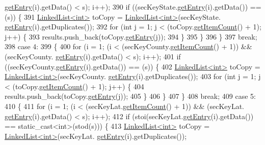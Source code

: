 \begin{DoxyCode}
      \hyperlink{classLinkedList_a341bfd7772c9d24d29eb7a7f3936915b}{getEntry}(i).getData() < s); i++);
390         \textcolor{keywordflow}{if} ((secKeyState.\hyperlink{classLinkedList_a341bfd7772c9d24d29eb7a7f3936915b}{getEntry}(i).getData()) == (s)) \{
391             \hyperlink{classLinkedList}{LinkedList<int>} toCopy = \hyperlink{classLinkedList}{LinkedList<int>}(secKeyState.
      \hyperlink{classLinkedList_a341bfd7772c9d24d29eb7a7f3936915b}{getEntry}(i).getDuplicates());
392             \textcolor{keywordflow}{for} (\textcolor{keywordtype}{int} j = 1; j < (toCopy.\hyperlink{classLinkedList_afc6635f854f48f2f126cf3b60d845220}{getItemCount}() + 1); j++) \{
393                 results.push\_back(toCopy.\hyperlink{classLinkedList_a341bfd7772c9d24d29eb7a7f3936915b}{getEntry}(j));
394             \}
395         \}
396     \}
397     \textcolor{keywordflow}{break};
398     \textcolor{keywordflow}{case} 4:
399     \{
400         \textcolor{keywordflow}{for} (i = 1; (i < (secKeyCounty.\hyperlink{classLinkedList_afc6635f854f48f2f126cf3b60d845220}{getItemCount}() + 1)) && (secKeyCounty.
      \hyperlink{classLinkedList_a341bfd7772c9d24d29eb7a7f3936915b}{getEntry}(i).getData() < s); i++);
401         \textcolor{keywordflow}{if} ((secKeyCounty.\hyperlink{classLinkedList_a341bfd7772c9d24d29eb7a7f3936915b}{getEntry}(i).getData()) == (s)) \{
402             \hyperlink{classLinkedList}{LinkedList<int>} toCopy = \hyperlink{classLinkedList}{LinkedList<int>}(secKeyCounty.
      \hyperlink{classLinkedList_a341bfd7772c9d24d29eb7a7f3936915b}{getEntry}(i).getDuplicates());
403             \textcolor{keywordflow}{for} (\textcolor{keywordtype}{int} j = 1; j < (toCopy.\hyperlink{classLinkedList_afc6635f854f48f2f126cf3b60d845220}{getItemCount}() + 1); j++) \{
404                 results.push\_back(toCopy.\hyperlink{classLinkedList_a341bfd7772c9d24d29eb7a7f3936915b}{getEntry}(j));
405             \}
406         \}
407     \}
408     \textcolor{keywordflow}{break};
409     \textcolor{keywordflow}{case} 5:
410     \{
411         \textcolor{keywordflow}{for} (i = 1; (i < (secKeyLat.\hyperlink{classLinkedList_afc6635f854f48f2f126cf3b60d845220}{getItemCount}() + 1)) && (secKeyLat.
      \hyperlink{classLinkedList_a341bfd7772c9d24d29eb7a7f3936915b}{getEntry}(i).getData() < s); i++);
412         \textcolor{keywordflow}{if} (stoi(secKeyLat.\hyperlink{classLinkedList_a341bfd7772c9d24d29eb7a7f3936915b}{getEntry}(i).getData()) == static\_cast<int>(stod(s))) \{
413             \hyperlink{classLinkedList}{LinkedList<int>} toCopy = \hyperlink{classLinkedList}{LinkedList<int>}(secKeyLat.
      \hyperlink{classLinkedList_a341bfd7772c9d24d29eb7a7f3936915b}{getEntry}(i).getDuplicates());

\end{DoxyCode}
